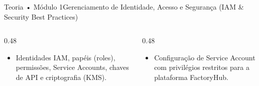 \begin{senaiframe}{Teoria • Módulo 1}{Gerenciamento de Identidade, Acesso e Segurança (IAM & Security Best Practices)}
  \begin{columns}[t]
    \begin{column}{0.48\textwidth}
      \begin{tcolorbox}[senaibluecard, title={Fundamentos Teóricos}]
        \begin{itemize}
          \item Identidades IAM, papéis (roles), permissões, Service Accounts, chaves de API e criptografia (KMS).
        \end{itemize}
      \end{tcolorbox}
    \end{column}
    \begin{column}{0.48\textwidth}
      \begin{tcolorbox}[senaigreencard, title={Prática \& Laboratório}]
        \begin{itemize}
          \item Configuração de Service Account com privilégios restritos para a plataforma FactoryHub.
        \end{itemize}
      \end{tcolorbox}
    \end{column}
  \end{columns}
\end{senaiframe}
